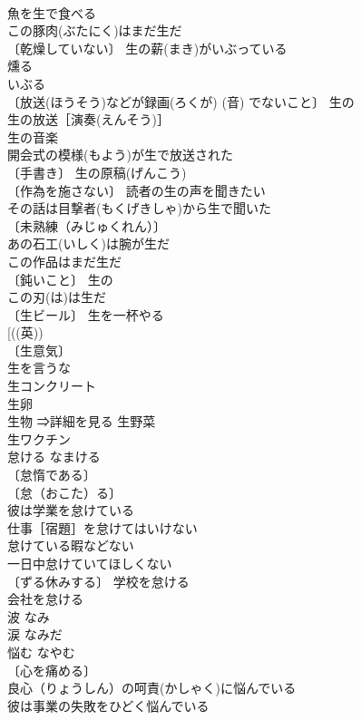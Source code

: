 \documentclass[8pt]{extreport}
\begin{document}
\begin{CJK}{UTF8}{min}
\\	魚を生で食べる 
\\	この豚肉(ぶたにく)はまだ生だ 
\\	〔乾燥していない〕 生の薪(まき)がいぶっている 
\\	燻る 
\\	いぶる　
\\	〔放送(ほうそう)などが録画(ろくが) (音) でないこと〕 生の 
\\	生の放送［演奏(えんそう)］ 
\\	生の音楽 
\\	開会式の模様(もよう)が生で放送された 
\\	〔手書き〕 生の原稿(げんこう) 
\\	〔作為を施さない〕 読者の生の声を聞きたい 
\\	その話は目撃者(もくげきしゃ)から生で聞いた 
\\	〔未熟練（みじゅくれん）〕　
\\	あの石工(いしく)は腕が生だ 
\\	この作品はまだ生だ 
\\	〔鈍いこと〕 生の 
\\	この刃(は)は生だ 
\\	〔生ビール〕 生を一杯やる 
\\	[((英))
\\	〔生意気〕 
\\	生を言うな 
\\	生コンクリート 
\\	生卵 
\\	生物 ⇒詳細を見る 生野菜 
\\	生ワクチン 
\\	怠ける	なまける	
\\	〔怠惰である〕
\\	〔怠（おこた）る〕
\\	彼は学業を怠けている 
\\	仕事［宿題］を怠けてはいけない 
\\	怠けている暇などない 
\\	一日中怠けていてほしくない 
\\	〔ずる休みする〕 学校を怠ける 
\\	会社を怠ける 
\\	波	なみ	
\\	涙	なみだ	
\\	悩む	なやむ	
\\	〔心を痛める〕
\\	良心（りょうしん）の呵責(かしゃく)に悩んでいる 
\\	彼は事業の失敗をひどく悩んでいる 

\end{CJK}
\end{document}
